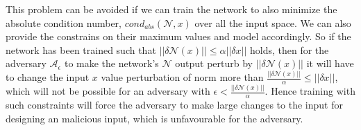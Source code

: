 This problem can be avoided if we can train the network to also minimize the absolute condition number, $cond_{abs}(\mathcal{N},x)$ over all the input space. We can also provide the constrains on their maximum values and model accordingly.\newline
So if the network has been trained such that $||\delta \mathcal{N}(x)||\le \alpha ||\delta x||$ holds, then for the adversary $\mathcal{A}_{\epsilon}$ to make the network's $\mathcal{N}$ output perturb by $||\delta \mathcal{N}(x)||$ it will have to change the input $x$ value perturbation of norm more than $\frac{||\delta \mathcal{N}(x)||}{\alpha} \le ||\delta x||$, which will not be possible for an adversary with $\epsilon < \frac{||\delta \mathcal{N}(x)||}{\alpha}$. Hence training with such constraints will force the adversary to make large changes to the input for designing an malicious input, which is unfavourable for the adversary.